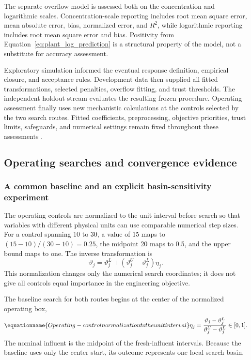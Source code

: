 The separate overflow model is assessed both on the concentration and logarithmic scales. Concentration-scale reporting includes root mean square error, mean absolute error, bias, normalized error, and $R^2$, while logarithmic reporting includes root mean square error and bias. Positivity from Equation~\eqref{eq:plant_log_prediction} is a structural property of the model, not a substitute for accuracy assessment.

Exploratory simulation informed the eventual response definition, empirical closure, and acceptance rules. Development data then supplied all fitted transformations, selected penalties, overflow fitting, and trust thresholds. The independent holdout stream evaluates the resulting frozen procedure. Operating assessment finally uses new mechanistic calculations at the controls selected by the two search routes. Fitted coefficients, preprocessing, objective priorities, trust limits, safeguards, and numerical settings remain fixed throughout these assessments \citep{Kaufman2012}.

\subsection{Operating searches and convergence evidence}

\subsubsection{A common baseline and an explicit basin-sensitivity experiment}

The operating controls are normalized to the unit interval before search so that variables with different physical units can use comparable numerical step sizes. For a control spanning 10 to 30, a value of 15 maps to $(15-10)/(30-10)=0.25$, the midpoint 20 maps to 0.5, and the upper bound maps to one. The inverse transformation is
\[
\vartheta_j=\vartheta_j^L+(\vartheta_j^U-\vartheta_j^L)\eta_j.
\]
This normalization changes only the numerical search coordinates; it does not give all controls equal importance in the engineering objective.

The baseline search for both routes begins at the center of the normalized operating box,
\begin{equation}
\equationname{Operating-control normalization to the unit interval}
\eta_j=\frac{\vartheta_j-\vartheta_j^L}{\vartheta_j^U-\vartheta_j^L}\in[0,1].
\label{eq:plant_normalized_controls}
\end{equation}
The nominal influent is the midpoint of the fresh-influent intervals. Because the baseline uses only the center start, its outcome represents one local search basin.

